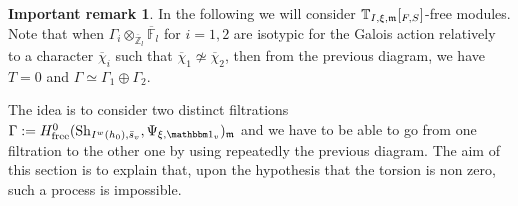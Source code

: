 \documentclass[JEP,XML,SOM,Unicode,published]{cedram}
\let\mathds\mathbbm
\newcommand{\NoChangel}[1]{%
\expandafter\let\csname old\string#1\endcsname=#1
\let#1=\relax
\newcommand{#1}{\mathcode`l="716C\csname old\string#1\endcsname\mathcode`l="7160 }%
}
\newcommand{\free}{\mathrm{free}}
\theoremstyle{plain}
\theoremstyle{definition}
\newtheorem*{iremark}{Important remark}
\numberwithin{equation}{subsection}
\newcommand\Tm{{\mathbb T}}
\newcommand\Fm{{\mathbb F}}
\newcommand\Zm{{\mathbb Z}}
\DeclareMathOperator{\sh}{Sh}
\DeclareMathOperator{\gal}{Gal}\NoChangel{\gal}
\begin{document}
\begin{iremark}
In the following we will consider $\Tm_{I,\xi,\mathfrak m}[\gal_{F,S}]$-free modules.
Note that
when $\Gamma_i \otimes_{\overline \Zm_l} \overline \Fm_l$ for $i=1,2$
are isotypic for the Galois action relatively to a character $\overline \chi_i$
such that $\overline \chi_1 \not \simeq \overline \chi_2$, then from the
previous diagram, we have $T=0$ and
$\Gamma \simeq \Gamma_1 \oplus \Gamma_2$.
\end{iremark}

The idea is to consider two distinct filtrations
$\Gamma:=H^0_{\free}(\sh_{I^w(h_0),\bar s_v},\Psi_{\xi,\mathds 1_v})_{\mathfrak m}$ and
we have to be able to go from one filtration to the other one by using
repeatedly the previous diagram.
The aim of this section is to explain that, upon the hypothesis that the
torsion is non zero, such a process is impossible.
\end{document}
